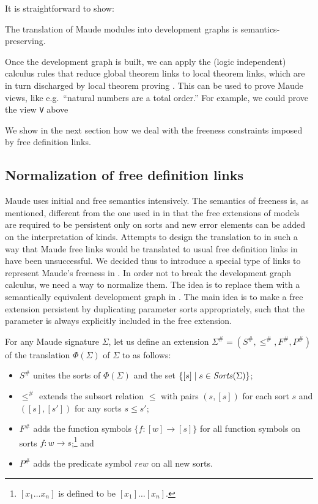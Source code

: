 It is straightforward to show:
\begin{theorem}
The translation of Maude modules into development graphs is
semantics-preserving.
\end{theorem}

Once the development graph is built, we can apply the (logic
independent) calculus rules that reduce global theorem links to local
theorem links, which are in turn discharged by local theorem proving
\cite{MAH-05-a}.  This can be used to prove Maude views, like e.g.\
``natural numbers are a total order.'' For example, we could prove
the view \verb"V" above


We show in the next
section how we deal with the freeness constraints imposed by free 
definition links.

\subsection{Normalization of free definition links}
\label{sec:free}

Maude uses initial and free semantics intensively. The semantics of
freeness is, as mentioned, different from the one used in \CASL in
that the free extensions of models are required to be persistent
only on sorts and new error elements can be added on the
interpretation of kinds. Attempts to design the translation to \CASL
in such a way that Maude free links would be translated to usual free
definition links in \CASL have been unsuccessful. We decided thus to
introduce a special type of links to represent Maude's freeness in
\CASL.  In order not to break the development graph calculus, we need
a way to normalize them. The idea is to replace them with a
semantically equivalent development graph in \CASL. The main idea is
to make a free extension persistent by duplicating parameter sorts
appropriately, such that the parameter is always explicitly included
in the free extension.

For any Maude signature $\Sigma$, let us define
an extension $\Sigma^\# = (S^\#, \leq^\#, F^\#, P^\#)$ of the
translation $\Phi(\Sigma)$ of $\Sigma$ to \CASL as follows:

\begin{itemize}

 \item $S^\#$ unites the sorts of $\Phi(\Sigma)$ and the set 
       $\{[s] \mid s \in \mathit{Sorts}(\Sigma)\}$;

 \item $\leq^\#$ extends the subsort relation $\leq$ with pairs
       $(s, [s])$ for each sort $s$ and $([s],[s'])$ for any sorts $s \leq s'$;

 \item $F^\#$ adds the function symbols $\{f:[w] \rightarrow [s]\}$ for all
       function symbols on sorts $f:w \rightarrow s $;\footnote{$[x_1 \ldots x_n]$
       is defined to be $[x_1] \ldots [x_n]$.} and
 \item $P^\#$ adds the predicate symbol $rew$ on all new sorts.
\end{itemize}

